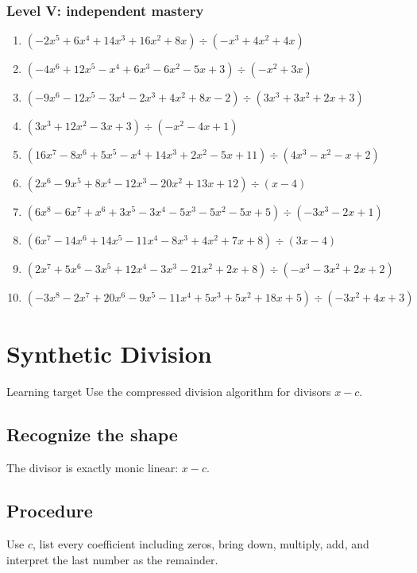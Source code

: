 \documentclass[11pt,oneside]{book}
\begin{document}
\subsection*{Level V: independent mastery}
\begin{enumerate}[leftmargin=*,label=\textbf{\arabic*.},itemsep=0.65\baselineskip]
\item $\displaystyle (- 2 x^{5} + 6 x^{4} + 14 x^{3} + 16 x^{2} + 8 x)\div(- x^{3} + 4 x^{2} + 4 x)$
\item $\displaystyle (- 4 x^{6} + 12 x^{5} - x^{4} + 6 x^{3} - 6 x^{2} - 5 x + 3)\div(- x^{2} + 3 x)$
\item $\displaystyle (- 9 x^{6} - 12 x^{5} - 3 x^{4} - 2 x^{3} + 4 x^{2} + 8 x - 2)\div(3 x^{3} + 3 x^{2} + 2 x + 3)$
\item $\displaystyle (3 x^{3} + 12 x^{2} - 3 x + 3)\div(- x^{2} - 4 x + 1)$
\item $\displaystyle (16 x^{7} - 8 x^{6} + 5 x^{5} - x^{4} + 14 x^{3} + 2 x^{2} - 5 x + 11)\div(4 x^{3} - x^{2} - x + 2)$
\item $\displaystyle (2 x^{6} - 9 x^{5} + 8 x^{4} - 12 x^{3} - 20 x^{2} + 13 x + 12)\div(x - 4)$
\item $\displaystyle (6 x^{8} - 6 x^{7} + x^{6} + 3 x^{5} - 3 x^{4} - 5 x^{3} - 5 x^{2} - 5 x + 5)\div(- 3 x^{3} - 2 x + 1)$
\item $\displaystyle (6 x^{7} - 14 x^{6} + 14 x^{5} - 11 x^{4} - 8 x^{3} + 4 x^{2} + 7 x + 8)\div(3 x - 4)$
\item $\displaystyle (2 x^{7} + 5 x^{6} - 3 x^{5} + 12 x^{4} - 3 x^{3} - 21 x^{2} + 2 x + 8)\div(- x^{3} - 3 x^{2} + 2 x + 2)$
\item $\displaystyle (- 3 x^{8} - 2 x^{7} + 20 x^{6} - 9 x^{5} - 11 x^{4} + 5 x^{3} + 5 x^{2} + 18 x + 5)\div(- 3 x^{2} + 4 x + 3)$
\end{enumerate}
\chapter{Synthetic Division}
\begin{rulebox}{Learning target}
Use the compressed division algorithm for divisors $x-c$.
\end{rulebox}
\section{Recognize the shape}
The divisor is exactly monic linear: $x-c$.
\section{Procedure}
Use $c$, list every coefficient including zeros, bring down, multiply, add, and interpret the last number as the remainder.
\end{document}
